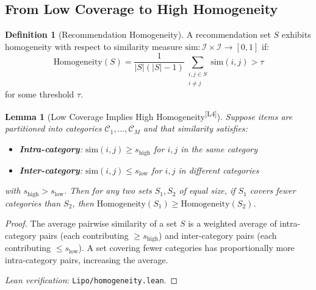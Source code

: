 \documentclass[11pt,a4paper]{article}
\theoremstyle{definition}
\newtheorem{definition}{Definition}[section]
\theoremstyle{plain}
\newtheorem{lemma}[theorem]{Lemma}
\theoremstyle{remark}
\newcommand{\leanmark}{\textsuperscript{\textcolor{green!50!black}{[L4]}}}
\begin{document}
\subsection{From Low Coverage to High Homogeneity}
\label{subsec:coverage_homogeneity}

\begin{definition}[Recommendation Homogeneity]
\label{def:homogeneity}
A recommendation set $S$ exhibits homogeneity with respect to similarity measure $\text{sim}: \mathcal{I} \times \mathcal{I} \rightarrow [0, 1]$ if:
\begin{equation}
    \text{Homogeneity}(S) = \frac{1}{|S|(|S|-1)} \sum_{\substack{i, j \in S \\ i \neq j}} \text{sim}(i, j) > \tau
\end{equation}
for some threshold $\tau$.
\end{definition}

\begin{lemma}[Low Coverage Implies High Homogeneity\leanmark]
\label{lem:coverage_homogeneity}
Suppose items are partitioned into categories $\mathcal{C}_1, \ldots, \mathcal{C}_M$ and that similarity satisfies:
\begin{itemize}
    \item \textbf{Intra-category}: $\mathrm{sim}(i, j) \geq s_{\mathrm{high}}$ for $i, j$ in the same category
    \item \textbf{Inter-category}: $\mathrm{sim}(i, j) \leq s_{\mathrm{low}}$ for $i, j$ in different categories
\end{itemize}
with $s_{\mathrm{high}} > s_{\mathrm{low}}$. Then for any two sets $S_1, S_2$ of equal size, if $S_1$ covers fewer categories than $S_2$, then $\mathrm{Homogeneity}(S_1) \geq \mathrm{Homogeneity}(S_2)$.
\end{lemma}

\begin{proof}
The average pairwise similarity of a set $S$ is a weighted average of intra-category pairs (each contributing $\geq s_{\text{high}}$) and inter-category pairs (each contributing $\leq s_{\text{low}}$). A set covering fewer categories has proportionally more intra-category pairs, increasing the average.

\smallskip
\noindent\textit{Lean verification}: \texttt{Lipo/homogeneity.lean}.
\end{proof}
\end{document}
